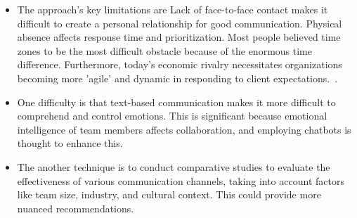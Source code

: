 \documentclass{llncs}
\begin{document}
\begin{itemize}

\item The approach's key limitations are Lack of face-to-face contact makes it difficult to create a personal relationship for good communication. Physical absence affects response time and prioritization. Most people believed time zones to be the most difficult obstacle because of the enormous time difference. Furthermore, today's economic rivalry necessitates organizations becoming more 'agile' and dynamic in responding to client expectations.~\cite{refpaper10}. \\

\item One difficulty is that text-based communication makes it more difficult to comprehend and control emotions. This is significant because emotional intelligence of team members affects collaboration, and employing chatbots is thought to enhance this.~\cite{refpaper11} \\

\item The another technique is to conduct comparative studies to evaluate the effectiveness of various communication channels, taking into account factors like team size, industry, and cultural context. This could provide more nuanced recommendations.

\end{itemize}
\end{document}

